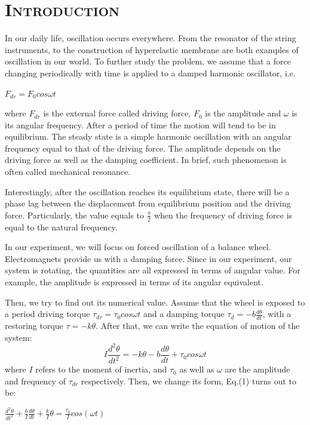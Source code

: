 \documentclass[a4paper,12pt]{article}
\begin{document}
\section{\textsc{Introduction}}
In our daily life, oscillation occurs everywhere. From the resonator of the string instruments, to the construction of hyperelastic membrane are both examples of oscillation in our world. To further study the problem, we assume that a force changing periodically with time is applied to a damped harmonic oscillator, i.e. 
\begin{center}
$F_{dr} = F_0 cos \omega t$
\end{center}
where $F_{dr}$ is the external force called driving force, $F_0$ is the amplitude and $\omega$ is its angular frequency. After a period of time the motion will tend to be in equilibrium. The steady state is a simple harmonic oscillation with an angular frequency equal to that of the driving force. The amplitude depends on the driving force as well as the damping coefficient. In brief, such phenomenon is often called mechanical resonance. \par
Interestingly, after the oscillation reaches its equilibrium state, there will be a phase lag between the displacement from equilibrium position and the driving force. Particularly, the value equals to $\frac{\pi}{2}$ when the frequency of driving force is equal to the natural frequency. \par 
In our experiment, we will focus on forced oscillation of a balance wheel. Electromagnets provide us with a damping force. Since in our experiment, our system is rotating, the quantities are all expressed in terms of angular value. For example, the amplitude is expressed in terms of its angular equivalent.\par 
Then, we try to find out its numerical value. Assume that the wheel is exposed to a period driving torque $\tau_{dr} = \tau_0 cos\omega t$ and a damping torque $\tau_d = -b\frac{d\theta}{dt}$, with a restoring torque $\tau = -k\theta$. After that, we can write the equation of motion of the system:
\begin{equation}
I\frac{d^2\theta}{dt^2} = -k\theta -b\frac{d\theta}{dt} + \tau_0 cos\omega t
\end{equation}
where $I$ refers to the moment of inertia, and $\tau_0$ as well as $\omega$ are the amplitude and frequency of $\tau_{dr}$ respectively. Then, we change its form, Eq.(1) turns out to be: 
\begin{center}
$\displaystyle \frac{d^2\theta}{dt^2} +\frac{b}{I}\frac{d\theta}{dt} + \frac{k}{I}\theta = \frac{\tau_0}{I} cos(\omega t)$
\end{center}
\end{document}
